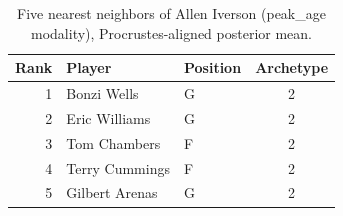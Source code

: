 \begin{table}[htbp]
  \centering\small
  \begin{tabular}{rllc}
    \toprule
    Rank & Player & Position & Archetype \\
    \midrule
    1 & Bonzi Wells & G & 2 \\
    2 & Eric Williams & G & 2 \\
    3 & Tom Chambers & F & 2 \\
    4 & Terry Cummings & F & 2 \\
    5 & Gilbert Arenas & G & 2 \\
    \bottomrule
  \end{tabular}
  \caption{Five nearest neighbors of Allen Iverson (peak_age modality), Procrustes-aligned posterior mean.}
  \label{tab:Allen_Iverson_neighbors_peak_age}
\end{table}

